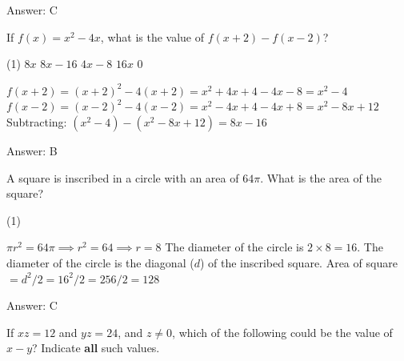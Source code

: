 \documentclass[11pt,paper=a4,answers]{exam}
\begin{document}
\begin{questions}
\begin{solution}
Answer: \colorbox{yellow!100}{C}
\end{solution}

\vspace{1cm}

\question
If $f(x) = x^2 - 4x$, what is the value of $f(x+2) - f(x-2)$?

\begin{tasks}(1)
\task[A)] $8x$ \task[B)] $8x-16$ \task[C)] $4x-8$ \task[D)] $16x$ \task[E)] $0$
\end{tasks}

\begin{solution}
\begin{center}
$f(x+2) = (x+2)^2 - 4(x+2) = x^2 + 4x + 4 - 4x - 8 = x^2 - 4$
\vspace{5pt}
$f(x-2) = (x-2)^2 - 4(x-2) = x^2 - 4x + 4 - 4x + 8 = x^2 - 8x + 12$
\vspace{5pt}
Subtracting: $(x^2 - 4) - (x^2 - 8x + 12) = 8x - 16$
\end{center}

Answer: \colorbox{yellow!100}{B}
\end{solution}

\vspace{1cm}

\question
A square is inscribed in a circle with an area of $64\pi$. What is the area of the square?

\begin{tasks}(1)
    
\end{tasks}

\begin{solution}
\begin{center}
$\pi r^2 = 64\pi \implies r^2 = 64 \implies r = 8$
\vspace{5pt}
The diameter of the circle is $2 \times 8 = 16$.
\vspace{5pt}
The diameter of the circle is the diagonal ($d$) of the inscribed square.
\vspace{5pt}
Area of square $= d^2 / 2 = 16^2 / 2 = 256 / 2 = 128$
\end{center}

Answer: \colorbox{yellow!100}{C}
\end{solution}

\vspace{1cm}


\question
If $xz=12$ and $yz=24$, and $z \neq 0$, which of the following could be the value of $x-y$?
Indicate \textbf{all} such values.


\end{questions}
\end{document}
